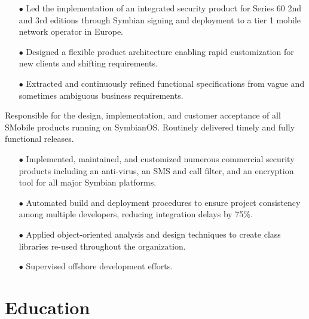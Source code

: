 \documentclass[12pt,letter,roman]{moderncv}
\begin{document}
\begin{itemize}

    \item[$\bullet$] Led the implementation of an integrated security product for Series
        60 2nd and 3rd editions through Symbian signing and deployment to a tier
        1 mobile network operator in Europe.

    \item[$\bullet$] Designed a flexible product architecture enabling rapid customization
        for new clients and shifting requirements.

    \item[$\bullet$] Extracted and continuously refined functional specifications from vague
        and sometimes ambiguous business requirements.

\end{itemize}

\vspace{0.5em}

Responsible for the design, implementation, and customer acceptance of all
SMobile products running on SymbianOS.  Routinely delivered timely and fully
functional releases.

\begin{itemize}

    \item[$\bullet$] Implemented, maintained, and customized numerous commercial security
        products including an anti-virus, an SMS and call filter, and an
        encryption tool for all major Symbian platforms.

    \item[$\bullet$] Automated build and deployment procedures to ensure project
        consistency among multiple developers, reducing integration delays by
        75\%.

    \item[$\bullet$] Applied object-oriented analysis and design techniques to create class
        libraries re-used throughout the organization.

    \item[$\bullet$] Supervised offshore development efforts.

\end{itemize}

\section{Education}

\end{document}
